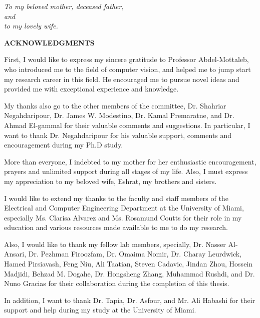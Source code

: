\newpage
\vspace*{2.5in}
\begin{center}
\emph{To my beloved mother, deceased father,\\
and \\ to my lovely wife.}
\end{center}

\newpage
\begin{center}
{\Large \textbf{ACKNOWLEDGMENTS}}
\end{center}
\vspace{10mm}

First, I would like to express my sincere gratitude to Professor
Abdel-Mottaleb, who introduced me to the field of computer vision,
and helped me to jump start my research career in this field. He
encouraged me to pursue novel ideas and provided me with exceptional
experience and knowledge.

\vspace{3mm}

My thanks also go to the other members of the committee, Dr.
Shahriar Negahdaripour, Dr. James W. Modestino, Dr. Kamal
Premaratne, and Dr. Ahmad El-gammal for their valuable comments and
suggestions. In particular, I want to thank Dr. Negahdaripour for
his valuable support, comments and encouragement during my Ph.D
study.

\vspace{3mm}

More than everyone, I indebted to my mother for her enthusiastic
encouragement, prayers and unlimited support during all stages of my
life. Also, I must express my appreciation to my beloved wife,
Eshrat, my brothers and sisters.

\vspace{3mm} I would like to extend my thanks to the faculty and
staff members of the Electrical and Computer Engineering Department
at the University of Miami, especially Ms. Clarisa Alvarez and Ms.
Rosamund Coutts for their role in my education and various resources
made available to me to do my research.

Also, I would like to thank my fellow lab members, specially, Dr.
Nasser Al-Ansari, Dr. Pezhman Firoozfam, Dr. Omaima Nomir, Dr.
Charay Leurdwick, Hamed Pirsiavash, Feng Niu, Ali Taatian, Steven
Cadavic, Jindan Zhou, Hossein Madjidi, Behzad M. Dogahe, Dr.
Hongsheng Zhang, Muhammad Rushdi, and Dr. Nuno Gracias for their
collaboration during the completion of this thesis.

\vspace{3mm} In addition, I want to thank Dr. Tapia, Dr. Asfour, and
Mr. Ali Habashi for their support and help during my study at the
University of Miami.
